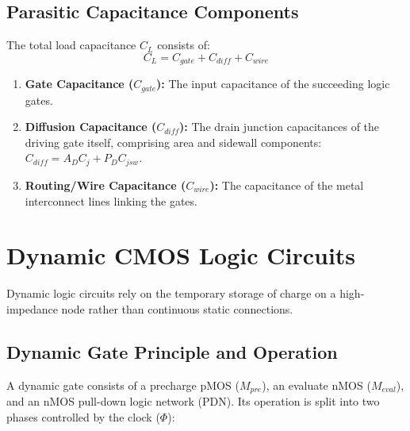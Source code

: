 \documentclass[12pt,a4paper]{article}
\begin{document}
\subsection{Parasitic Capacitance Components}
The total load capacitance $C_L$ consists of:
\begin{equation}
  C_L = C_{gate} + C_{diff} + C_{wire}
\end{equation}
\begin{enumerate}[label=\arabic*., leftmargin=*]
  \item \textbf{Gate Capacitance ($C_{gate}$):} The input capacitance of the succeeding logic gates.
  \item \textbf{Diffusion Capacitance ($C_{diff}$):} The drain junction capacitances of the driving gate itself, comprising area and sidewall components: $C_{diff} = A_D C_{j} + P_D C_{jsw}$.
  \item \textbf{Routing/Wire Capacitance ($C_{wire}$):} The capacitance of the metal interconnect lines linking the gates.
\end{enumerate}

\section{Dynamic CMOS Logic Circuits}

Dynamic logic circuits rely on the temporary storage of charge on a high-impedance node rather than continuous static connections.

\subsection{Dynamic Gate Principle and Operation}
A dynamic gate consists of a precharge pMOS ($M_{pre}$), an evaluate nMOS ($M_{eval}$), and an nMOS pull-down logic network (PDN). Its operation is split into two phases controlled by the clock ($\Phi$):
\end{document}
